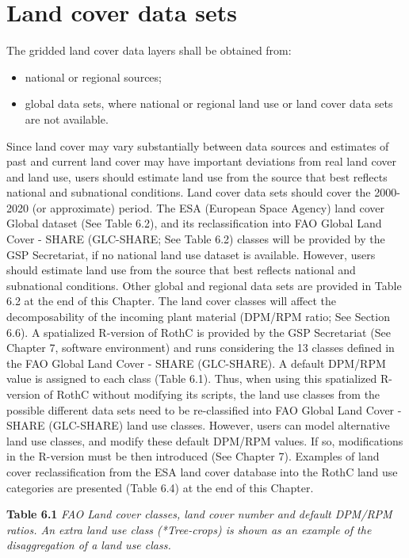 \documentclass[
  10pt,
  b5paper,
]{book}
\providecommand{\tightlist}{%
  \setlength{\itemsep}{0pt}\setlength{\parskip}{0pt}}
\begin{document}
\hypertarget{land-cover-data-sets}{%
\section{Land cover data sets}\label{land-cover-data-sets}}

The gridded land cover data layers shall be obtained from:

\begin{itemize}
\tightlist
\item
  national or regional sources;
\item
  global data sets, where national or regional land use or land cover data sets are not available.
\end{itemize}

Since land cover may vary substantially between data sources and estimates of past and current land cover may have important deviations from real land cover and land use, users should estimate land use from the source that best reflects national and subnational conditions. Land cover data sets should cover the 2000-2020 (or approximate) period.
The ESA (European Space Agency) land cover Global dataset (See Table 6.2), and its reclassification into FAO Global Land Cover - SHARE (GLC-SHARE; See Table 6.2) classes will be provided by the GSP Secretariat, if no national land use dataset is available. However, users should estimate land use from the source that best reflects national and subnational conditions. Other global and regional data sets are provided in Table 6.2 at the end of this Chapter.
The land cover classes will affect the decomposability of the incoming plant material (DPM/RPM ratio; See Section 6.6). A spatialized R-version of RothC is provided by the GSP Secretariat (See Chapter 7, software environment) and runs considering the 13 classes defined in the FAO Global Land Cover - SHARE (GLC-SHARE). A default DPM/RPM value is assigned to each class (Table 6.1). Thus, when using this spatialized R-version of RothC without modifying its scripts, the land use classes from the possible different data sets need to be re-classified into FAO Global Land Cover - SHARE (GLC-SHARE) land use classes. However, users can model alternative land use classes, and modify these default DPM/RPM values. If so, modifications in the R-version must be then introduced (See Chapter 7). Examples of land cover reclassification from the ESA land cover database into the RothC land use categories are presented (Table 6.4) at the end of this Chapter.

\textbf{Table 6.1} \emph{FAO Land cover classes, land cover number and default DPM/RPM ratios. An extra land use class (*Tree-crops) is shown as an example of the disaggregation of a land use class.}
\end{document}
